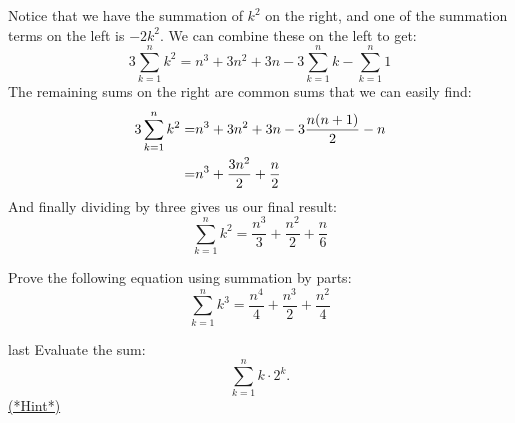 Notice that we have the summation of $k^2$ on the right, and one of the summation terms on the left is $-2k^2$.  We can combine these on the left to get:
\[ 3 \sum_{k=1}^n k^2 =n^3 + 3n^2 + 3n - 3\sum_{k=1}^n k - \sum_{k=1}^n 1 \]
The remaining sums on the right are common sums that we can easily find:
\begin{align}
3 \sum_{k=1}^n k^2 =& n^3 + 3n^2 + 3n - 3\frac{n(n+1)}{2} - n \notag\\
=& n^3 + \frac{3n^2}{2} + \frac{n}{2} \notag
\end{align}
And finally dividing by three gives us our final result:
\[ \sum_{k=1}^n k^2 = \frac{n^3}{3} + \frac{n^2}{2} + \frac{n}{6} \]

\begin{exercise}{}
Prove the following equation using summation by parts:
\[ \sum_{k=1}^n k^3 = \frac{n^4}{4} + \frac{n^3}{2} + \frac{n^2}{4} \]
\end{exercise}

\begin{exercise}{last} Evaluate the sum: 
\[\sum_{k=1}^n k \cdot 2^k.\]
\hyperref[sec:sigma:hints]{(*Hint*)} 
\end{exercise}

